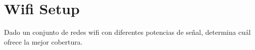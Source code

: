\documentclass{article}
\begin{document}
\section*{Wifi Setup}
Dado un conjunto de redes wifi con diferentes potencias de se\~nal, determina cu\'al ofrece la mejor cobertura.
\end{document}
